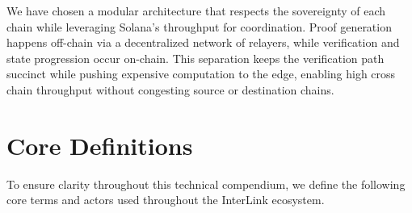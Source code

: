 \documentclass[11pt,a4paper]{article}
\begin{document}
We have chosen a modular architecture that respects the sovereignty of each chain while leveraging Solana's throughput for coordination. Proof generation happens off-chain via a decentralized network of relayers, while verification and state progression occur on-chain. This separation keeps the verification path succinct while pushing expensive computation to the edge, enabling high cross chain throughput without congesting source or destination chains.

\section{Core Definitions}
\label{sec:definitions}

To ensure clarity throughout this technical compendium, we define the following core terms and actors used throughout the InterLink ecosystem.
\end{document}
